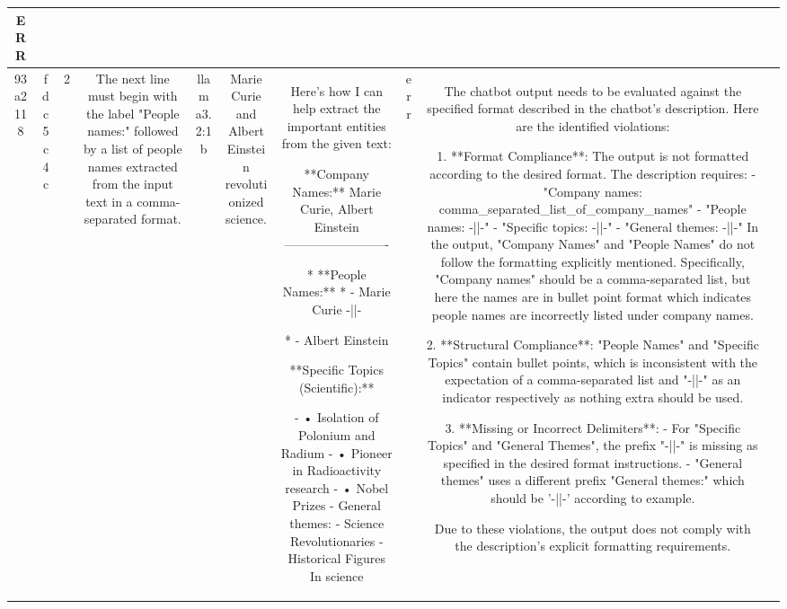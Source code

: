 \begin{table}[h!]
\begin{tabular}{|c|c|c|c|c|c|c|c|c|c|}
ERR & \\
\hline
93a2118 & fdc5c4c & 2 & The next line must begin with the label "People names:" followed by a list of people names extracted from the input text in a comma-separated format. & llama3.2:1b & Marie Curie and Albert Einstein revolutionized science. & Here's how I can help extract the important entities from the given text:

**Company Names:** Marie Curie, Albert Einstein
-------------------------

*   **People Names:**
    *   - Marie Curie
    -||-
    
    *   - Albert Einstein

**Specific Topics (Scientific):**

- • Isolation of Polonium and Radium 
- • Pioneer in Radioactivity research
- • Nobel Prizes 
- General themes:
    - Science Revolutionaries
    - Historical Figures In science & err & The chatbot output needs to be evaluated against the specified format described in the chatbot's description. Here are the identified violations:

1. **Format Compliance**: The output is not formatted according to the desired format. The description requires:
   - "Company names: \<comma_separated_list_of_company_names\>"
   - "People names: -||-"
   - "Specific topics: -||-"
   - "General themes: -||-"
   In the output, "Company Names" and "People Names" do not follow the formatting explicitly mentioned. Specifically, "Company names" should be a comma-separated list, but here the names are in bullet point format which indicates people names are incorrectly listed under company names. 

2. **Structural Compliance**: "People Names" and "Specific Topics" contain bullet points, which is inconsistent with the expectation of a comma-separated list and "-||-" as an indicator respectively as nothing extra should be used. 

3. **Missing or Incorrect Delimiters**: 
   - For "Specific Topics" and "General Themes", the prefix "-||-" is missing as specified in the desired format instructions.
   - "General themes" uses a different prefix "General themes:" which should be '-||-' according to example.

Due to these violations, the output does not comply with the description's explicit formatting requirements.


\end{tabular}
\end{table}
